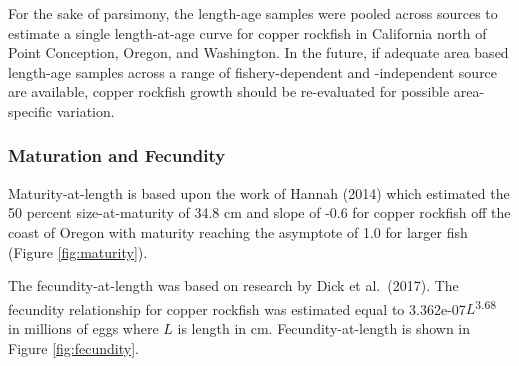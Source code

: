 \documentclass[11pt,
  english,
  a4paper,
]{article}
\begin{document}
\leavevmode\tagmcend\tagstructend\par


For the sake of parsimony, the length-age samples were pooled across sources to estimate a single length-at-age curve for copper rockfish in California north of Point Conception, Oregon, and Washington. In the future, if adequate area based length-age samples across a range of fishery-dependent and -independent source are available, copper rockfish growth should be re-evaluated for possible area-specific variation.

\leavevmode\tagmcend\tagstructend\par


\hypertarget{maturation-and-fecundity}{%
\subsubsection{Maturation and Fecundity}\label{maturation-and-fecundity}}

\leavevmode\tagmcend\tagstructend


Maturity-at-length is based upon the work of Hannah {(2014)\leavevmode\tagmcend\tagstructend} which estimated the 50 percent size-at-maturity of 34.8 cm and slope of -0.6 for copper rockfish off the coast of Oregon with maturity reaching the asymptote of 1.0 for larger fish (Figure \ref{fig:maturity}).

\leavevmode\tagmcend\tagstructend\par


The fecundity-at-length was based on research by Dick et al.~{(2017)\leavevmode\tagmcend\tagstructend}. The fecundity relationship for copper rockfish was estimated equal to 3.362e-07{\(L\)\leavevmode\tagmcend\tagstructend}\textsuperscript{3.68} in millions of eggs where {\(L\)\leavevmode\tagmcend\tagstructend} is length in cm. Fecundity-at-length is shown in Figure \ref{fig:fecundity}.

\leavevmode\tagmcend\tagstructend\par
\end{document}
